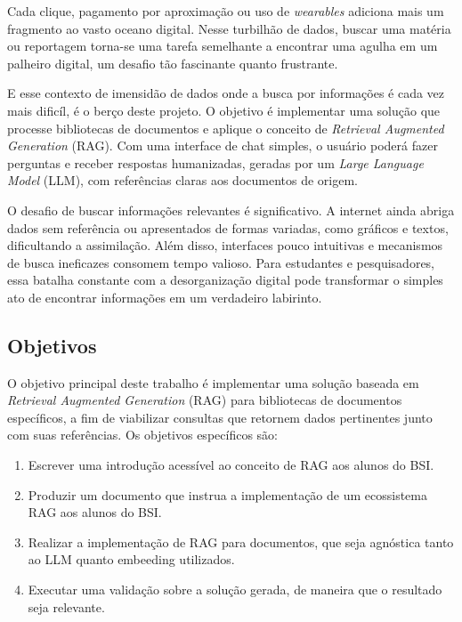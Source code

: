\documentclass[a4paper, 12pt]{article}
\begin{document}
    Cada clique, pagamento por aproximação ou uso de \textit{wearables} adiciona mais um fragmento ao vasto oceano digital. Nesse turbilhão de dados, buscar uma matéria ou reportagem torna-se uma tarefa semelhante a encontrar uma agulha em um palheiro digital, um desafio tão fascinante quanto frustrante.

    E esse contexto de imensidão de dados onde a busca por informações é cada vez mais dificíl, é o berço deste projeto. O objetivo é implementar uma solução que processe bibliotecas de documentos e aplique o conceito de \textit{Retrieval Augmented Generation} (RAG). Com uma interface de chat simples, o usuário poderá fazer perguntas e receber respostas humanizadas, geradas por um \textit{Large Language Model} (LLM), com referências claras aos documentos de origem.

    O desafio de buscar informações relevantes é significativo. A internet ainda abriga dados sem referência ou apresentados de formas variadas, como gráficos e textos, dificultando a assimilação. Além disso, interfaces pouco intuitivas e mecanismos de busca ineficazes consomem tempo valioso. Para estudantes e pesquisadores, essa batalha constante com a desorganização digital pode transformar o simples ato de encontrar informações em um verdadeiro labirinto.

    \subsection{Objetivos} \label{sec:objectives}

    O objetivo principal deste trabalho é implementar uma solução baseada em \textit{Retrieval Augmented Generation} (RAG) para bibliotecas de documentos específicos, a fim de viabilizar consultas que retornem dados pertinentes junto com suas referências. Os objetivos específicos são:
    
    \begin{enumerate}
        \item Escrever uma introdução acessível ao conceito de RAG aos alunos do BSI.
        \item Produzir um documento que instrua a implementação de um ecossistema RAG aos alunos do BSI.
        \item Realizar a implementação de RAG para documentos, que seja agnóstica tanto ao LLM quanto embeeding utilizados.
        \item Executar uma validação sobre a solução gerada, de maneira que o resultado seja relevante.
    \end{enumerate}
\end{document}
